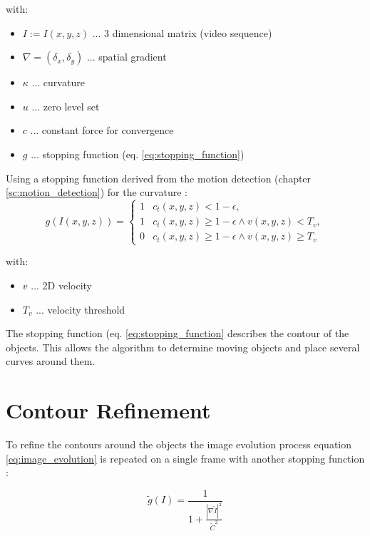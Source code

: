\documentclass[]{article}
\begin{document}
	with:
	\begin{itemize}[label={}]
		\item $I := I(x,y,z)$ ... 3 dimensional matrix (video sequence)  
		\item $\nabla = (\delta_x, \delta_y)$ ... spatial gradient
		\item $\kappa$ ... curvature
		\item $u$ ... zero level set \cite{osher1988fronts} 
		\item $c$ ... constant force for convergence
		\item $g$ ... stopping function (eq. \ref{eq:stopping_function})
	\end{itemize} 
	
Using a stopping function derived from the motion detection (chapter \ref{sc:motion_detection}) for the curvature \cite{kuhne2001tensor} \cite{kichenassamy1996conformal}:
 	\begin{equation}
 		g(I(x,y,z)) = 
 		\begin{cases}
 			1 & c_t(x,y,z) < 1-\epsilon, \\
 			1 & c_t(x,y,z) \geq 1-\epsilon \wedge v(x,y,z) < T_v, \\
 			0 & c_t(x,y,z) \geq 1-\epsilon \wedge v(x,y,z) \geq T_v
 		\end{cases}
 		\label{eq:stopping_function}
 	\end{equation}   
 		
 	with:
	\begin{itemize}[label={}]
		\item $v$ ... 2D velocity
		\item $T_v$ ... velocity threshold
	\end{itemize}
 	
The stopping function (eq. \ref{eq:stopping_function} describes the contour of the objects.
This allows the algorithm to determine moving objects and place several curves around them. 	

\section{Contour Refinement}
\label{sc:contour_refinement}

To refine the contours around the objects the image evolution process equation  \ref{eq:image_evolution} is repeated on a single frame with another stopping function \cite{kuhne2001tensor}:

	\begin{equation}
		\tilde{g}(I) = \frac{1}{1+\frac{|\nabla \tilde{I}|^2}{\tilde{C}^2}}
	\end{equation} 
 
\end{document}
